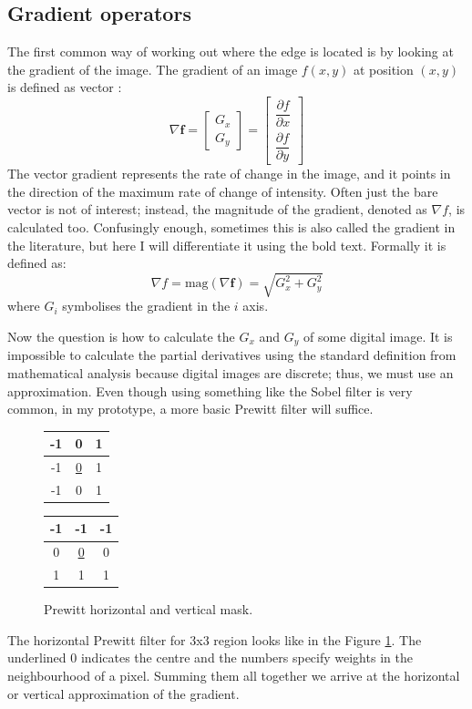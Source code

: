 \documentclass[
  digital,     %
  oneside,     %
  nosansbold,  %
  nocolorbold, %
  lof,         %
  lot,         %
]{fithesis4}
\begin{document}
\subsection{Gradient operators}

The first common way of working out where the edge is located is by looking at
the gradient of the image. The gradient of an image $f(x,y)$ at position $(x,
y)$ is defined as vector
\parencite{gonzalez2002}:
$$\nabla \textbf{f} =
\begin{bmatrix}
    G_x \\
    G_y
\end{bmatrix} =
\begin{bmatrix}
    \dfrac{\partial f}{\partial x}\\[2ex]
    \dfrac{\partial f}{\partial y}
\end{bmatrix}$$
The vector gradient represents the rate of change in the image, and it points in
the direction of the maximum rate of change of intensity. Often just the bare
vector is not of interest; instead, the magnitude of the gradient, denoted as
$\nabla f$, is calculated too. Confusingly enough, sometimes this is also called
the gradient in the literature, but here I will differentiate it using the bold
text. Formally it is defined as:
$$\nabla f = \text{mag}(\nabla \textbf{f}) = \sqrt{G_x^2 + G_y^2}$$
where $G_i$ symbolises the gradient in the $i$ axis.

Now the question is how to calculate the $G_x$ and $G_y$ of some digital image.
It is impossible to calculate the partial derivatives using the standard
definition from mathematical analysis because digital images are discrete; thus,
we must use an approximation. Even though using something like the Sobel filter
is very common, in my prototype, a more basic Prewitt filter will suffice.
\begin{figure}
    \begin{center}
        \begin{tabular}{ |c|c|c| }
            \hline
            -1 & 0 & 1 \\
            \hline
            -1 & \underline{0} & 1 \\
            \hline
            -1 & 0 & 1 \\
            \hline
        \end{tabular}
        \begin{tabular}{ |c|c|c| }
            \hline
            -1 & -1 & -1 \\
            \hline
            0 & \underline{0} & 0 \\
            \hline
            1 & 1 & 1 \\
            \hline
        \end{tabular}
    \end{center}
    \caption{Prewitt horizontal and vertical mask.}
    \label{table:prewitt}
\end{figure}
The horizontal Prewitt filter for 3x3 region looks like in the Figure
\ref{table:prewitt}.
The underlined 0 indicates the centre and the numbers specify weights in the
neighbourhood of a pixel. Summing them all together we arrive at the horizontal or
vertical approximation of the gradient.
\end{document}

